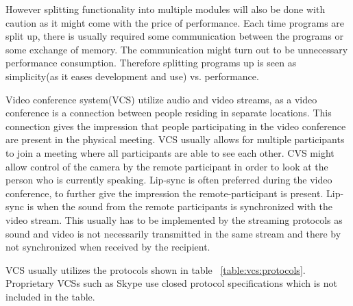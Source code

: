 However splitting functionality into multiple modules will also be done with caution as it might come with the price of performance. Each time programs are split up, there is usually required some communication between the programs or some exchange of memory. The communication might turn out to be unnecessary performance consumption. Therefore splitting programs up is seen as simplicity(as it eases development and use) vs. performance.








Video conference system(VCS) utilize audio and video streams, as a video conference is a connection between people residing in separate locations. This connection gives the impression that people participating in the video conference are present in the physical meeting. VCS usually allows for multiple participants to join a meeting where all participants are able to see each other. CVS might allow control of the camera by the remote participant in order to look at the person who is currently speaking. 
Lip-sync is often preferred during the video conference, to further give the impression the remote-participant is present. Lip-sync is when the sound from the remote participants is synchronized with the video stream. This usually has to be implemented by the streaming protocols as sound and video is not necessarily transmitted in the same stream and there by not synchronized when received by the recipient.


VCS usually utilizes the protocols shown in table ~\ref{table:vcs:protocols}. Proprietary VCSs such as Skype use closed protocol specifications which is not included in the table.


\begin{table}[]
	\centering
	\caption{Table showing protocols usually used in a video conference system.}
	\label{my-label}
\end{table}

